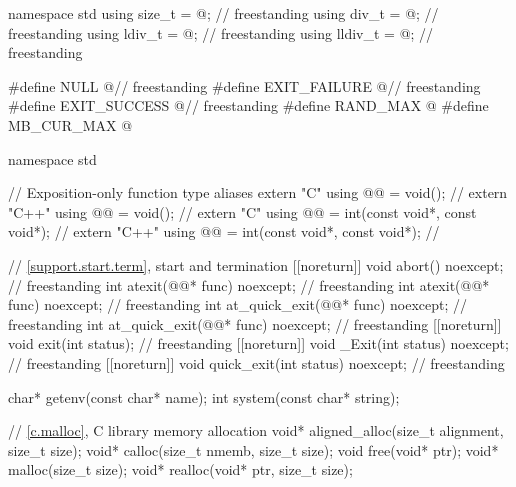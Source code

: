 \begin{codeblock}
namespace std {
  using size_t = @\seebelow@;                                             // freestanding
  using div_t = @\seebelow@;                                              // freestanding
  using ldiv_t = @\seebelow@;                                             // freestanding
  using lldiv_t = @\seebelow@;                                            // freestanding
}

#define NULL @\seebelow@                                                  // freestanding
#define EXIT_FAILURE @\seebelow@                                          // freestanding
#define EXIT_SUCCESS @\seebelow@                                          // freestanding
#define RAND_MAX @\seebelow@
#define MB_CUR_MAX @\seebelow@

namespace std {
  // Exposition-only function type aliases
  extern "C" using @@ = void();                           // \expos
  extern "C++" using @@ = void();                           // \expos
  extern "C" using @@ = int(const void*, const void*);      // \expos
  extern "C++" using @@ = int(const void*, const void*);      // \expos

  // \ref{support.start.term}, start and termination
  [[noreturn]] void abort() noexcept;                                   // freestanding
  int atexit(@@* func) noexcept;                          // freestanding
  int atexit(@@* func) noexcept;                            // freestanding
  int at_quick_exit(@@* func) noexcept;                   // freestanding
  int at_quick_exit(@@* func) noexcept;                     // freestanding
  [[noreturn]] void exit(int status);                                   // freestanding
  [[noreturn]] void _Exit(int status) noexcept;                         // freestanding
  [[noreturn]] void quick_exit(int status) noexcept;                    // freestanding

  char* getenv(const char* name);
  int system(const char* string);

  // \ref{c.malloc}, C library memory allocation
  void* aligned_alloc(size_t alignment, size_t size);
  void* calloc(size_t nmemb, size_t size);
  void free(void* ptr);
  void* malloc(size_t size);
  void* realloc(void* ptr, size_t size);

}
\end{codeblock}
